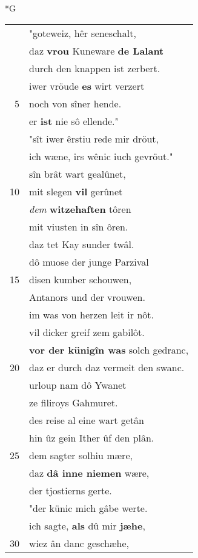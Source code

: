 \documentclass[8pt,a4paper,notitlepage]{article}
\begin{document}
\begin{table}[ht]
\begin{minipage}[t]{0.5\linewidth}
\small
\begin{center}*G
\end{center}
\begin{tabular}{rl}
 & "goteweiz, hêr seneschalt,\\ 
 & daz \textbf{vrou} Kuneware \textbf{de Lalant}\\ 
 & durch den knappen ist zerbert.\\ 
 & iwer vröude \textbf{es} wirt verzert\\ 
5 & noch von sîner hende.\\ 
 & er \textbf{ist} nie sô ellende."\\ 
 & "sît iwer êrstiu rede mir dröut,\\ 
 & ich wæne, irs wênic iuch gevröut."\\ 
 & sîn brât wart gealûnet,\\ 
10 & mit slegen \textbf{vil} gerûnet\\ 
 & \textit{dem} \textbf{witzehaften} tôren\\ 
 & mit viusten in sîn ôren.\\ 
 & daz tet Kay sunder twâl.\\ 
 & dô muose der junge Parzival\\ 
15 & disen kumber schouwen,\\ 
 & Antanors und der vrouwen.\\ 
 & im was von herzen leit ir nôt.\\ 
 & vil dicker greif zem gabilôt.\\ 
 & \textbf{vor der künigîn was} solch gedranc,\\ 
20 & daz er durch daz vermeit den swanc.\\ 
 & urloup nam dô Ywanet\\ 
 & ze filiroys Gahmuret.\\ 
 & des reise al eine wart getân\\ 
 & hin ûz gein Ither ûf den plân.\\ 
25 & dem sagter solhiu mære,\\ 
 & daz \textbf{dâ inne niemen} wære,\\ 
 & der tjostierns gerte.\\ 
 & "der künic mich gâbe werte.\\ 
 & ich sagte, \textbf{als} dû mir \textbf{jæhe},\\ 
30 & wiez ân danc geschæhe,\\ 

\end{tabular}
\end{minipage}
\end{table}
\end{document}
